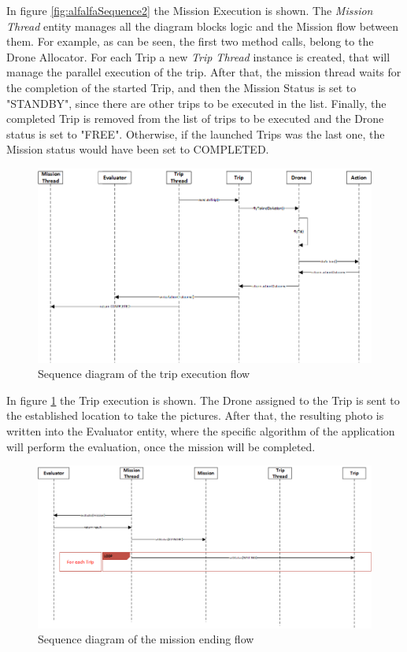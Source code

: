 In figure \ref{fig:alfalfaSequence2} the Mission Execution is shown.
The \textit{Mission Thread} entity manages all the diagram blocks logic and the Mission flow between them. For example, as can be seen, the first two method calls, belong to the Drone Allocator. 
For each Trip a new \textit{Trip Thread} instance is created, that will manage the parallel execution of the trip.
After that, the mission thread waits for the completion of the started Trip, and then the Mission Status is set to "STANDBY", since there are other trips to be executed in the list.
Finally, the completed Trip is removed from the list of trips to be executed and the Drone status is set to "FREE".
Otherwise, if the launched Trips was the last one, the Mission status would have been set to COMPLETED.
\\

\begin{figure}[H]
  \centering
  \includegraphics[width=\linewidth]{pictures/Alfalfa_Sequence_TripExecution.png}
  \caption{Sequence diagram of the trip execution flow}
  \label{fig:alfalfaSequence3}
\end{figure}

In figure \ref{fig:alfalfaSequence3} the Trip execution is shown.
The Drone assigned to the Trip is sent to the established location to take the pictures.
After that, the resulting photo is written into the Evaluator entity, where the specific algorithm of the application will perform the evaluation, once the mission will be completed.
\\

\begin{figure}[H]
  \centering
  \includegraphics[width=\linewidth]{pictures/Alfalfa_Sequence_MissionEnd.png}
  \caption{Sequence diagram of the mission ending flow}
  \label{fig:alfalfaSequence4}
\end{figure}

